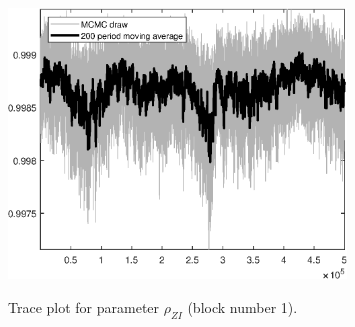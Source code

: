 \begin{figure}[H]
\centering
  \includegraphics[width=0.8\textwidth]{BRS_growth_ext_fd/graphs/TracePlot_rho_ZI_blck_1}\\
    \caption{Trace plot for parameter ${\rho_{ZI}}$ (block number 1).}
\end{figure}
